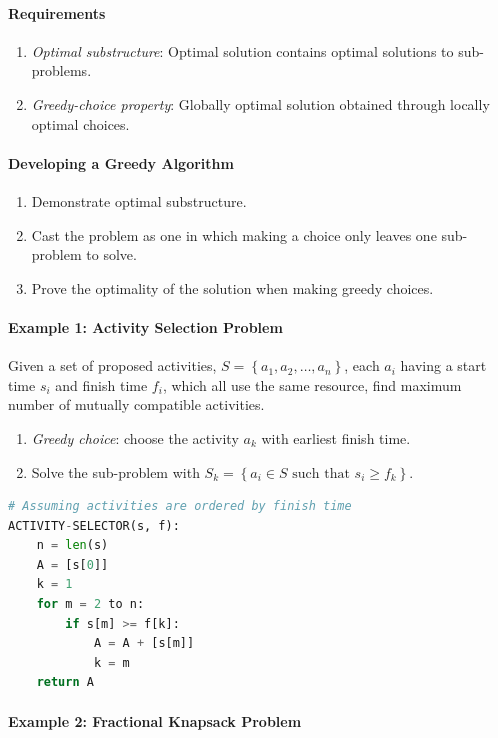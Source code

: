 \documentclass[twocolumn,english]{article}
\numberwithin{equation}{section}
\numberwithin{figure}{section}
\numberwithin{table}{section}
\begin{document}
\paragraph{Requirements}
\begin{enumerate}
\item \emph{Optimal substructure}: Optimal solution contains optimal solutions
to sub-problems.
\item \emph{Greedy-choice property}: Globally optimal solution obtained
through locally optimal choices.
\end{enumerate}

\paragraph{Developing a Greedy Algorithm}
\begin{enumerate}
\item Demonstrate optimal substructure.
\item Cast the problem as one in which making a choice only leaves one sub-problem
to solve.
\item Prove the optimality of the solution when making greedy choices.
\end{enumerate}

\paragraph{Example 1: Activity Selection Problem}

Given a set of proposed activities, $S=\left\{ a_{1},a_{2},\dots,a_{n}\right\} $,
each $a_{i}$ having a start time $s_{i}$ and finish time $f_{i}$,
which all use the same resource, find maximum number of mutually compatible
activities.
\begin{enumerate}
\item \emph{Greedy choice}: choose the activity $a_{k}$ with earliest finish
time.
\item Solve the sub-problem with $S_{k}=\left\{ a_{i}\in S\text{ such that }s_{i}\geq f_{k}\right\} $.
\end{enumerate}
\begin{lstlisting}[language=Python,basicstyle={\footnotesize\ttfamily},tabsize=4,frame=single]
# Assuming activities are ordered by finish time
ACTIVITY-SELECTOR(s, f):
	n = len(s)
	A = [s[0]]
	k = 1
	for m = 2 to n:
		if s[m] >= f[k]:
			A = A + [s[m]]
			k = m
	return A
\end{lstlisting}

\paragraph{Example 2: Fractional Knapsack Problem}
\end{document}
